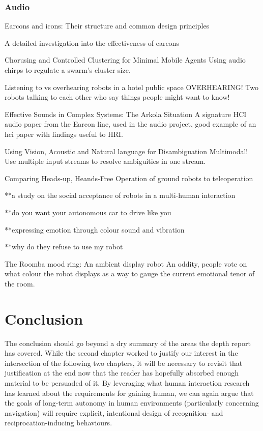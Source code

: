\documentclass{sfuthesis}
\begin{document}
\subsection{Audio}

Earcons and icons: Their structure and common design principles

A detailed investigation into the effectiveness of earcons

Chorusing and Controlled Clustering for Minimal Mobile Agents	Using audio chirps to regulate a swarm's cluster size.	

Listening to vs overhearing robots in a hotel public space	OVERHEARING! Two robots talking to each other who say things people might want to know!	

Effective Sounds in Complex Systems: The Arkola Situation   A signature HCI audio paper from the Earcon line, used in the audio project, good example of an hci paper with findings useful to HRI.

Using Vision, Acoustic and Natural language for Disambiguation	Multimodal! Use multiple input streams to resolve ambiguities in one stream.






Comparing Heads-up, Heands-Free Operation of ground robots to teleoperation

**a study on the social acceptance of robots in a multi-human interaction

**do you want your autonomous car to drive like you

**expressing emotion through colour sound and vibration

**why do they refuse to use my robot

The Roomba mood ring: An ambient display robot	An oddity, people vote on what colour the robot displays as a way to gauge the current emotional tenor of the room.




\chapter{Conclusion}

The conclusion should go beyond a dry summary of the areas the depth report has covered. While the second chapter worked to justify our interest in the intersection of the following two chapters, it will be necessary to revisit that justification at the end now that the reader has hopefully absorbed enough material to be persuaded of it. By leveraging what human interaction research has learned about the requirements for gaining human, we can again argue that the goals of long-term autonomy in human environments (particularly concerning navigation) will require explicit, intentional design of recognition- and reciprocation-inducing behaviours.
\end{document}
